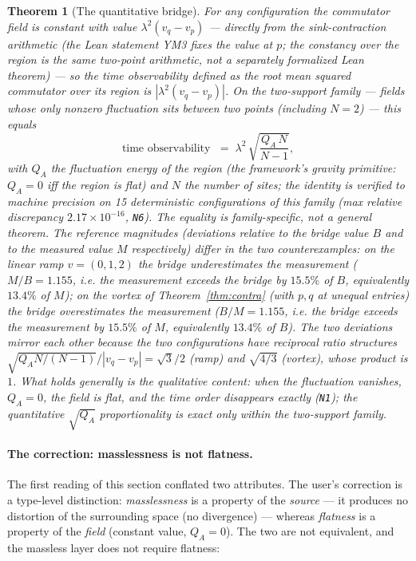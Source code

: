 \documentclass[aps,prd,preprint,superscriptaddress,amsmath,amssymb]{revtex4-2}
\newtheorem{theorem}{Theorem}[section]
\begin{document}
\begin{theorem}[The quantitative bridge]
\label{thm:bridge}
For any configuration the commutator field is constant with value
$\lambda^2(v_q-v_p)$ --- directly from the sink-contraction
arithmetic (the Lean statement YM3 fixes the value at $p$; the
constancy over the region is the same two-point arithmetic, not a
separately formalized Lean theorem) --- so the time observability
defined as the root mean squared commutator over its region is
$|\lambda^2(v_q-v_p)|$.  On the two-support family --- fields whose
only nonzero fluctuation sits between two points (including $N=2$) ---
this equals
\begin{equation}
\text{time observability }
\;=\; \lambda^2\,\sqrt{\frac{Q_A\,N}{N-1}},
\label{eq:timeobs}
\end{equation}
with $Q_A$ the fluctuation energy of the region (the framework's
gravity primitive: $Q_A=0$ iff the region is flat) and $N$ the number
of sites; the identity is verified to machine precision on 15
deterministic configurations of this family (max relative discrepancy
$2.17\times10^{-16}$, \texttt{N6}).  The equality is
family-specific, not a general theorem.  The reference magnitudes
(deviations relative to the bridge value $B$ and to the measured
value $M$ respectively) differ in the two counterexamples: on the
linear ramp $v=(0,1,2)$ the bridge \emph{underestimates} the
measurement ($M/B=1.155$, i.e. the measurement exceeds the bridge by
$15.5\%$ of $B$, equivalently $13.4\%$ of $M$); on the vortex of
Theorem~\ref{thm:contra} (with $p,q$ at unequal entries) the bridge
\emph{overestimates} the measurement ($B/M=1.155$, i.e. the bridge
exceeds the measurement by $15.5\%$ of $M$, equivalently $13.4\%$
of $B$).  The two deviations mirror each other because the two
configurations have reciprocal ratio structures
$\sqrt{Q_A N/(N-1)}/|v_q-v_p| = \sqrt3/2$ (ramp) and
$\sqrt{4/3}$ (vortex), whose product is $1$.  What holds generally
is the qualitative content:
when the fluctuation vanishes, $Q_A=0$, the field is flat, and the
time order disappears exactly (\texttt{N1}); the quantitative
$\sqrt{Q_A}$ proportionality is exact only within the two-support
family.
\end{theorem}

\paragraph{The correction: masslessness is not flatness.}
The first reading of this section conflated two attributes.  The
user's correction is a type-level distinction: \emph{masslessness} is a
property of the \emph{source} --- it produces no distortion of the
surrounding space (no divergence) --- whereas \emph{flatness} is a
property of the \emph{field} (constant value, $Q_A=0$).  The two are
not equivalent, and the massless layer does not require flatness:
\end{document}
